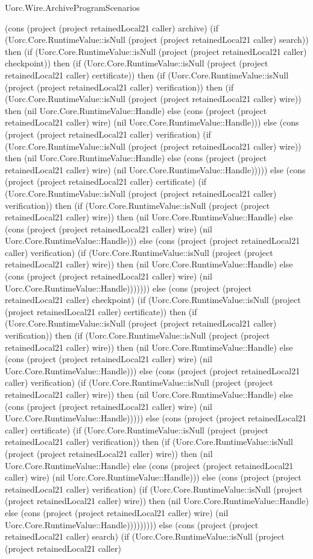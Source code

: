 \begin{lexlean}{Uorc.Wire.ArchiveProgramScenarios}
\begin{semanticmodule}
{(cons (project (project retainedLocal21 caller) archive) (if (Uorc.Core.RuntimeValue::isNull (project (project retainedLocal21 caller) search)) then (if (Uorc.Core.RuntimeValue::isNull (project (project retainedLocal21 caller) checkpoint)) then (if (Uorc.Core.RuntimeValue::isNull (project (project retainedLocal21 caller) certificate)) then (if (Uorc.Core.RuntimeValue::isNull (project (project retainedLocal21 caller) verification)) then (if (Uorc.Core.RuntimeValue::isNull (project (project retainedLocal21 caller) wire)) then (nil Uorc.Core.RuntimeValue::Handle) else (cons (project (project retainedLocal21 caller) wire) (nil Uorc.Core.RuntimeValue::Handle))) else (cons (project (project retainedLocal21 caller) verification) (if (Uorc.Core.RuntimeValue::isNull (project (project retainedLocal21 caller) wire)) then (nil Uorc.Core.RuntimeValue::Handle) else (cons (project (project retainedLocal21 caller) wire) (nil Uorc.Core.RuntimeValue::Handle))))) else (cons (project (project retainedLocal21 caller) certificate) (if (Uorc.Core.RuntimeValue::isNull (project (project retainedLocal21 caller) verification)) then (if (Uorc.Core.RuntimeValue::isNull (project (project retainedLocal21 caller) wire)) then (nil Uorc.Core.RuntimeValue::Handle) else (cons (project (project retainedLocal21 caller) wire) (nil Uorc.Core.RuntimeValue::Handle))) else (cons (project (project retainedLocal21 caller) verification) (if (Uorc.Core.RuntimeValue::isNull (project (project retainedLocal21 caller) wire)) then (nil Uorc.Core.RuntimeValue::Handle) else (cons (project (project retainedLocal21 caller) wire) (nil Uorc.Core.RuntimeValue::Handle))))))) else (cons (project (project retainedLocal21 caller) checkpoint) (if (Uorc.Core.RuntimeValue::isNull (project (project retainedLocal21 caller) certificate)) then (if (Uorc.Core.RuntimeValue::isNull (project (project retainedLocal21 caller) verification)) then (if (Uorc.Core.RuntimeValue::isNull (project (project retainedLocal21 caller) wire)) then (nil Uorc.Core.RuntimeValue::Handle) else (cons (project (project retainedLocal21 caller) wire) (nil Uorc.Core.RuntimeValue::Handle))) else (cons (project (project retainedLocal21 caller) verification) (if (Uorc.Core.RuntimeValue::isNull (project (project retainedLocal21 caller) wire)) then (nil Uorc.Core.RuntimeValue::Handle) else (cons (project (project retainedLocal21 caller) wire) (nil Uorc.Core.RuntimeValue::Handle))))) else (cons (project (project retainedLocal21 caller) certificate) (if (Uorc.Core.RuntimeValue::isNull (project (project retainedLocal21 caller) verification)) then (if (Uorc.Core.RuntimeValue::isNull (project (project retainedLocal21 caller) wire)) then (nil Uorc.Core.RuntimeValue::Handle) else (cons (project (project retainedLocal21 caller) wire) (nil Uorc.Core.RuntimeValue::Handle))) else (cons (project (project retainedLocal21 caller) verification) (if (Uorc.Core.RuntimeValue::isNull (project (project retainedLocal21 caller) wire)) then (nil Uorc.Core.RuntimeValue::Handle) else (cons (project (project retainedLocal21 caller) wire) (nil Uorc.Core.RuntimeValue::Handle))))))))) else (cons (project (project retainedLocal21 caller) search) (if (Uorc.Core.RuntimeValue::isNull (project (project retainedLocal21 caller) }
\end{semanticmodule}
\end{lexlean}
